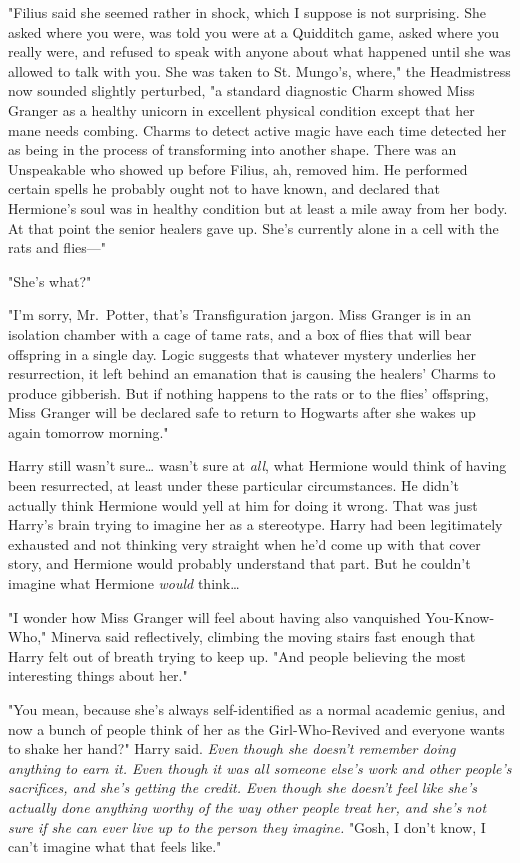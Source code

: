"Filius said she seemed rather in shock, which I suppose is not surprising. She
asked where you were, was told you were at a Quidditch game, asked where you
really were, and refused to speak with anyone about what happened until she was
allowed to talk with you. She was taken to St. Mungo's, where," the
Headmistress now sounded slightly perturbed, "a standard diagnostic Charm
showed Miss Granger as a healthy unicorn in excellent physical condition except
that her mane needs combing. Charms to detect active magic have each time
detected her as being in the process of transforming into another shape. There
was an Unspeakable who showed up before Filius, ah, removed him. He performed
certain spells he probably ought not to have known, and declared that
Hermione's soul was in healthy condition but at least a mile away from her
body. At that point the senior healers gave up. She's currently alone in a cell
with the rats and flies---"

"She's what?"

"I'm sorry, Mr.~Potter, that's Transfiguration jargon. Miss Granger is in an
isolation chamber with a cage of tame rats, and a box of flies that will bear
offspring in a single day. Logic suggests that whatever mystery underlies her
resurrection, it left behind an emanation that is causing the healers' Charms
to produce gibberish. But if nothing happens to the rats or to the flies'
offspring, Miss Granger will be declared safe to return to Hogwarts after she
wakes up again tomorrow morning."

Harry still wasn't sure{\ldots} wasn't sure at \emph{all}, what Hermione would
think of having been resurrected, at least under these particular
circumstances. He didn't actually think Hermione would yell at him for doing it
wrong. That was just Harry's brain trying to imagine her as a stereotype. Harry
had been legitimately exhausted and not thinking very straight when he'd come
up with that cover story, and Hermione would probably understand that part. But
he couldn't imagine what Hermione \emph{would} think{\ldots}

"I wonder how Miss Granger will feel about having also vanquished
You-Know-Who," Minerva said reflectively, climbing the moving stairs fast
enough that Harry felt out of breath trying to keep up. "And people believing
the most interesting things about her."

"You mean, because she's always self-identified as a normal academic genius,
and now a bunch of people think of her as the Girl-Who-Revived and everyone
wants to shake her hand?" Harry said. \emph{Even though she doesn't remember
doing anything to earn it. Even though it was all someone else's work and other
people's sacrifices, and she's getting the credit. Even though she doesn't feel
like she's actually done anything worthy of the way other people treat her, and
she's not sure if she can ever live up to the person they imagine.} "Gosh, I
don't know, I can't imagine what that feels like."

